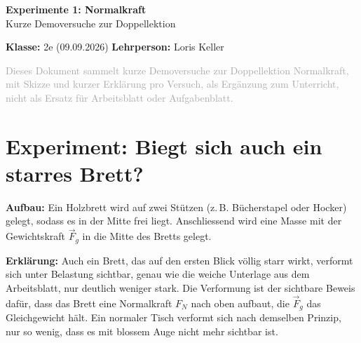 \documentclass[11pt,a4paper]{article}
\begin{document}
\sloppy

\begin{center}
{\Huge\bfseries\color{titleblue}Experimente 1: Normalkraft}\\[0.4em]
{\large Kurze Demoversuche zur Doppellektion}
\end{center}
\vspace{0.5em}

\noindent\textbf{Klasse:} 2e (09.09.2026) \hfill \textbf{Lehrperson:} Loris Keller

\vspace{0.3em}
\noindent\textcolor{darkgray}{Dieses Dokument sammelt kurze Demoversuche zur
Doppellektion Normalkraft, mit Skizze und kurzer Erklärung pro Versuch, als
Ergänzung zum Unterricht, nicht als Ersatz für Arbeitsblatt oder
Aufgabenblatt.}

\section*{Experiment: Biegt sich auch ein starres Brett?}

\textbf{Aufbau:} Ein Holzbrett wird auf zwei Stützen (z.\,B. Bücherstapel
oder Hocker) gelegt, sodass es in der Mitte frei liegt. Anschliessend
wird eine Masse mit der Gewichtskraft $\vec F_g$ in die Mitte des
Bretts gelegt.

\begin{center}
\hspace{0.6cm}
\end{center}

\textbf{Erklärung:} Auch ein Brett, das auf den ersten Blick völlig
starr wirkt, verformt sich unter Belastung sichtbar, genau wie die
weiche Unterlage aus dem Arbeitsblatt, nur deutlich weniger stark. Die
Verformung ist der sichtbare Beweis dafür, dass das Brett eine
Normalkraft $F_N$ nach oben aufbaut, die $\vec F_g$ das Gleichgewicht
hält. Ein normaler Tisch verformt sich nach demselben Prinzip, nur so
wenig, dass es mit blossem Auge nicht mehr sichtbar ist.
\end{document}
